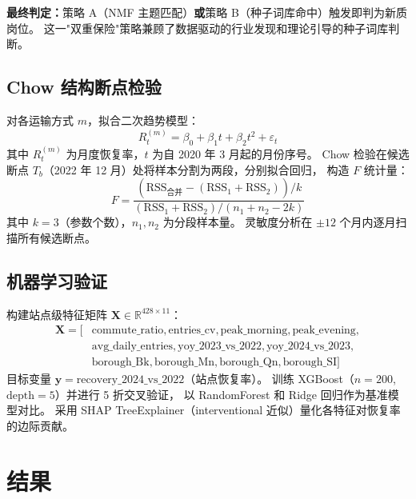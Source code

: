 \documentclass[runningheads]{llncs}
\begin{document}
\textbf{最终判定：}策略 A（NMF 主题匹配）\textbf{或}策略 B（种子词库命中）触发即判为新质岗位。
这一"双重保险"策略兼顾了数据驱动的行业发现和理论引导的种子词库判断。

\subsection{Chow 结构断点检验}

对各运输方式 $m$，拟合二次趋势模型：
\begin{equation}
R_t^{(m)} = \beta_0 + \beta_1 t + \beta_2 t^2 + \varepsilon_t
\label{eq:quadratic}
\end{equation}
其中 $R_t^{(m)}$ 为月度恢复率，$t$ 为自 2020 年 3 月起的月份序号。
Chow 检验在候选断点 $T_b$（2022 年 12 月）处将样本分割为两段，分别拟合回归，
构造 $F$ 统计量：
\begin{equation}
F = \frac{(\text{RSS}_{\text{合并}} - (\text{RSS}_1 + \text{RSS}_2)) / k}
         {(\text{RSS}_1 + \text{RSS}_2) / (n_1 + n_2 - 2k)}
\label{eq:chow}
\end{equation}
其中 $k=3$（参数个数），$n_1, n_2$ 为分段样本量。
灵敏度分析在 $\pm 12$ 个月内逐月扫描所有候选断点。

\subsection{机器学习验证}

构建站点级特征矩阵 $\mathbf{X} \in \mathbb{R}^{428 \times 11}$：
\begin{equation}
\begin{aligned}
\mathbf{X} = [&\text{commute\_ratio}, \text{entries\_cv}, \text{peak\_morning}, \text{peak\_evening},\\
              &\text{avg\_daily\_entries}, \text{yoy\_2023\_vs\_2022}, \text{yoy\_2024\_vs\_2023},\\
              &\text{borough\_Bk}, \text{borough\_Mn}, \text{borough\_Qn}, \text{borough\_SI}]
\end{aligned}
\end{equation}
目标变量 $\mathbf{y} = \text{recovery\_2024\_vs\_2022}$（站点恢复率）。
训练 XGBoost（$n=200$, $\text{depth}=5$）并进行 5 折交叉验证，
以 RandomForest 和 Ridge 回归作为基准模型对比。
采用 SHAP TreeExplainer（interventional 近似）量化各特征对恢复率的边际贡献。

\section{结果}
\end{document}
